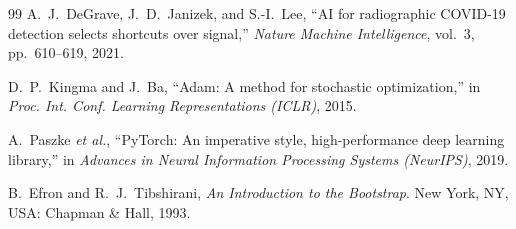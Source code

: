 \documentclass[conference]{IEEEtran}
\begin{document}
\begin{thebibliography}{99}
A.~J.~DeGrave, J.~D.~Janizek, and S.-I.~Lee, ``AI for radiographic COVID-19 detection selects shortcuts over signal,'' \emph{Nature Machine Intelligence}, vol.~3, pp.~610--619, 2021.

D.~P.~Kingma and J.~Ba, ``Adam: A method for stochastic optimization,'' in \emph{Proc. Int. Conf. Learning Representations (ICLR)}, 2015.

A.~Paszke \emph{et al.}, ``PyTorch: An imperative style, high-performance deep learning library,'' in \emph{Advances in Neural Information Processing Systems (NeurIPS)}, 2019.

B.~Efron and R.~J.~Tibshirani, \emph{An Introduction to the Bootstrap}. New York, NY, USA: Chapman \& Hall, 1993.

\end{thebibliography}
\end{document}
